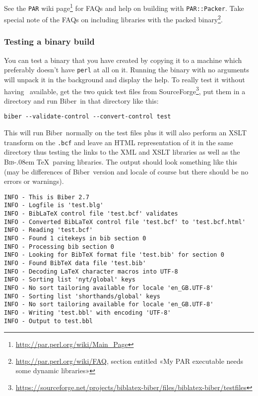 \documentclass{ltxdockit}
\def\BibTeX{\textsc{Bib}\kern-.08em \TeX}
\newcommand*{\biber}{Biber\xspace}
\begin{document}
See the \verb+PAR+ wiki
page\footnote{\url{http://par.perl.org/wiki/Main_Page}} for FAQs and help
on building with \verb+PAR::Packer+. Take special note of the FAQs on
including libraries with the packed
binary\footnote{\url{http://par.perl.org/wiki/FAQ}, section entitled «My
  PAR executable needs some dynamic libraries»}.

\subsubsection{Testing a binary build}
You can test a binary that you have created by copying it to a machine
which preferably doesn't have \verb+perl+ at all on it. Running the binary with no
arguments will unpack it in the background and display the help. To really
test it without having \latex\ available, get the two quick test files from
SourceForge\footnote{\url{https://sourceforge.net/projects/biblatex-biber/files/biblatex-biber/testfiles}},
put them in a directory and run \biber\ in that directory like this:

\begin{verbatim}
biber --validate-control --convert-control test
\end{verbatim}

\noindent This will run \biber\ normally on the test files plus it
will also perform an XSLT transform on the \verb+.bcf+ and
leave an HTML representation of it in the same directory thus testing the
links to the XML and XSLT libraries as well as the \BibTeX\ parsing
libraries. The output should look something like this (may be differences
of \biber\ version and locale of course but there should be no errors
or warnings).

\begin{verbatim}
INFO - This is Biber 2.7
INFO - Logfile is 'test.blg'
INFO - BibLaTeX control file 'test.bcf' validates
INFO - Converted BibLaTeX control file 'test.bcf' to 'test.bcf.html'
INFO - Reading 'test.bcf'
INFO - Found 1 citekeys in bib section 0
INFO - Processing bib section 0
INFO - Looking for BibTeX format file 'test.bib' for section 0
INFO - Found BibTeX data file 'test.bib'
INFO - Decoding LaTeX character macros into UTF-8
INFO - Sorting list 'nyt/global' keys
INFO - No sort tailoring available for locale 'en_GB.UTF-8'
INFO - Sorting list 'shorthands/global' keys
INFO - No sort tailoring available for locale 'en_GB.UTF-8'
INFO - Writing 'test.bbl' with encoding 'UTF-8'
INFO - Output to test.bbl
\end{verbatim}
\end{document}
